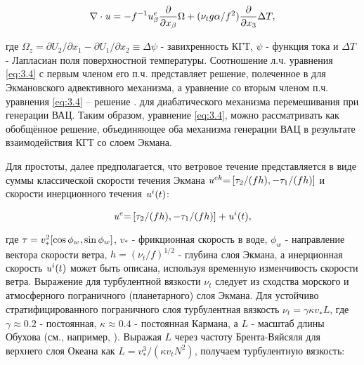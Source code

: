 \begin{equation} \label{eq:3.4} \nabla \cdot {\it u}=-f^{-1} u_{\beta }^{e} \frac{\partial }{\partial x_{\beta } } \Omega +(\nu _{t} g\alpha /f^{2} )\frac{\partial }{\partial x_{3} } \Delta T,  \end{equation} 



\noindent где $\Omega _{z} =\partial U_{2} /\partial x_{1} -\partial U_{1} /\partial x_{2} \equiv \Delta \psi $ - завихренность КГТ, $\psi $ - функция тока и $\Delta T$ - Лапласиан поля поверхностной температуры. Соотношение л.ч. уравнения \eqref{eq:3.4} с первым членом его п.ч. представляет решение, полеченное в \citep{Klein1990} для Экмановского адвективного механизма, а уравнение со вторым членом п.ч. уравнения \eqref{eq:3.4} -- решение \citep{Garrett1981}. для диабатического механизма перемешивания при генерации ВАЦ. Таким образом, уравнение \eqref{eq:3.4}, можно рассматривать как обобщённое решение, объединяющее оба механизма генерации ВАЦ в результате взаимодействия КГТ со слоем Экмана.

Для простоты, далее предполагается, что ветровое течение представляется в виде суммы классической скорости течения Экмана ${\it u}^{ek} {\it =}\left[\tau _{2} /(fh),-\tau _{1} /(fh)\right]$ и скорости инерционного течения ${\it u}^{i} (t)$:



\begin{equation} \label{eq:3.5} {\it u}^{e} {\it =}\left[\tau _{2} /(fh),-\tau _{1} /(fh)\right]+{\it u}^{i} (t),  \end{equation} 



\noindent где ${\it \tau }=v_{*}^{2} [\cos \phi _{w} ,\sin \phi _{w} ]$, $v_{*} $ - фрикционная скорость в воде, $\phi _{w} $ - направление вектора скорости ветра, $h=(\nu _{t} /f)^{1/2} $ - глубина слоя Экмана, а инерционная скорость ${\it u}^{i} (t)$ может быть описана, используя временную изменчивость скорости ветра. Выражение для турбулентной вязкости $\nu _{t} $ следует из сходства морского и атмосферного пограничного (планетарного) слоя Экмана. Для устойчиво стратифицированного пограничного слоя турбулентная вязкость $\nu _{t} =\gamma \kappa v_{*}^{} L$, где $\gamma \approx 0.2$ - постоянная, $\kappa \approx 0.4$ - постоянная Кармана, а $L$ - масштаб длины Обухова (см., например, \citep{Brown1982}). Выражая $L$ через частоту Брента-Вяйсяля для верхнего слоя Океана как $L=v_{*}^{3} /(\kappa v_{t} N^{2} )$, получаем турбулентную вязкость:



